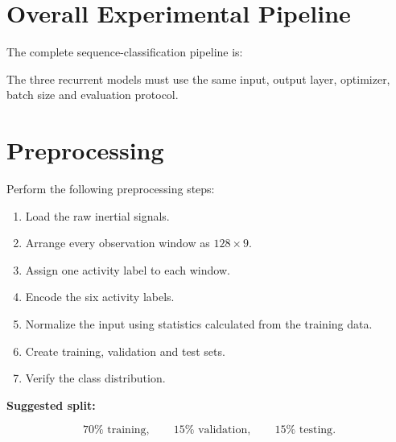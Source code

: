 \documentclass[10pt]{article}
\begin{document}
\section{Overall Experimental Pipeline}

The complete sequence-classification pipeline is:

\begin{center}
\end{center}

The three recurrent models must use the same input, output layer, optimizer,
batch size and evaluation protocol.

\section{Preprocessing}

Perform the following preprocessing steps:

\begin{enumerate}
\item Load the raw inertial signals.
\item Arrange every observation window as $128\times9$.
\item Assign one activity label to each window.
\item Encode the six activity labels.
\item Normalize the input using statistics calculated from the training data.
\item Create training, validation and test sets.
\item Verify the class distribution.
\end{enumerate}

\textbf{Suggested split:}

\[
70\% \text{ training},\qquad
15\% \text{ validation},\qquad
15\% \text{ testing}.
\]
\end{document}
